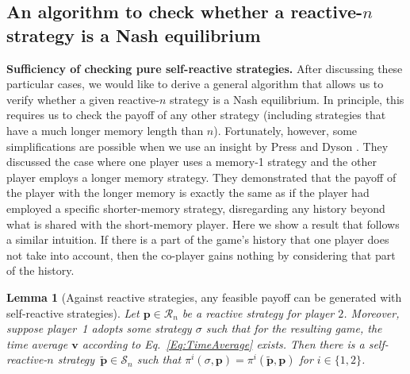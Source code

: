 \documentclass[11pt]{article}
\theoremstyle{plainCl1}
\newtheorem{lemma}{Lemma}
\theoremstyle{plainCl2}
\begin{document}

\subsection{An algorithm to check whether a reactive-$n$ strategy is a Nash equilibrium}
\label{Sec:Algorithm}

{\bf Sufficiency of checking pure self-reactive strategies.}
After discussing these particular cases, we would like to derive a general algorithm that allows us to verify whether a given reactive-$n$ strategy is a Nash equilibrium. 
In principle, this requires us to check the payoff of any other strategy (including strategies that have a much longer memory length than $n$). Fortunately, however, some simplifications are possible when we use an insight by Press and Dyson \cite{press:PNAS:2012}.
They discussed the case where one player uses a memory-1
strategy and the other player employs a longer memory strategy. They
demonstrated that the payoff of the player with the longer memory is exactly the
same as if the player had employed a specific shorter-memory strategy,
disregarding any history beyond what is shared with the short-memory player.
Here we show a result that follows a similar intuition. 
If there is a part of the game's history that one player does not take into account, then the co-player gains nothing by
considering that part of the history. 

\begin{lemma}[Against reactive strategies, any feasible payoff can be generated with self-reactive strategies] \label{lemma:self_reactive_sufficiency}
 Let $\mathbf{p}\!\in\!\mathcal{R}_n$ be a reactive strategy for player $2$. 
 Moreover, suppose player~1 adopts some strategy $\sigma$ such that for the resulting game, the time average $\mathbf{v}$ according to Eq.~\eqref{Eq:TimeAverage} exists. 
 Then there is a self-reactive-$n$ strategy~$\mathbf{\tilde p}\!\in\!\mathcal{S}_n$ such that $\pi^i(\sigma, \mathbf{p})\! = \!\pi^i(\mathbf{\tilde{p}}, \mathbf{p})$ for $i\!\in\!\{1,2\}$.
\end{lemma}
\end{document}
